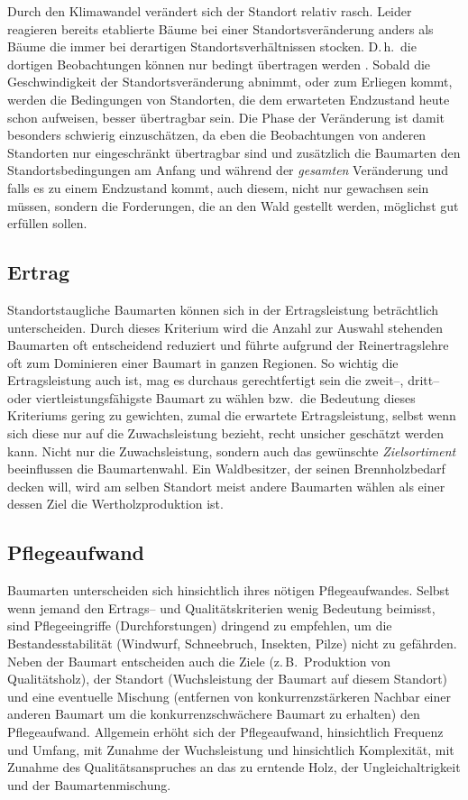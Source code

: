 \documentclass[twocolumn]{scrartcl}
\begin{document}
Durch den Klimawandel verändert sich der Standort relativ
rasch. Leider reagieren bereits etablierte Bäume bei einer
Standortsveränderung anders als Bäume die immer bei derartigen
Standortsverhältnissen stocken. D.\,h.\ die dortigen Beobachtungen können
nur bedingt übertragen werden \cite{yue2022SiteIndex}. Sobald die
Geschwindigkeit der Standortsveränderung abnimmt, oder zum Erliegen
kommt, werden die Bedingungen von Standorten, die dem erwarteten Endzustand
heute schon aufweisen, besser übertragbar sein. Die Phase der
Veränderung ist damit besonders schwierig einzuschätzen, da eben die
Beobachtungen von anderen Standorten nur eingeschränkt übertragbar
sind und zusätzlich die Baumarten den Standortsbedingungen am Anfang
und während der \emph{gesamten} Veränderung und falls es zu einem
Endzustand kommt, auch diesem, nicht nur gewachsen sein müssen, sondern
die Forderungen, die an den Wald gestellt werden, möglichst gut
erfüllen sollen.

\subsection{Ertrag}
\label{ssec:ertrag}

Standortstaugliche Baumarten können sich in der Ertragsleistung
beträchtlich unterscheiden. Durch dieses Kriterium wird die Anzahl zur
Auswahl stehenden Baumarten oft entscheidend reduziert und führte
aufgrund der Reinertragslehre oft zum Dominieren einer Baumart in
ganzen Regionen. So wichtig die Ertragsleistung auch ist, mag es
durchaus gerechtfertigt sein die zweit--, dritt-- oder
viertleistungsfähigste Baumart zu wählen bzw.\ die Bedeutung dieses
Kriteriums gering zu gewichten, zumal die erwartete Ertragsleistung,
selbst wenn sich diese nur auf die Zuwachsleistung bezieht, recht
unsicher geschätzt werden kann. Nicht nur die Zuwachsleistung, sondern
auch das gewünschte \emph{Zielsortiment} beeinflussen die
Baumartenwahl. Ein Waldbesitzer, der seinen Brennholzbedarf decken
will, wird am selben Standort meist andere Baumarten wählen als einer
dessen Ziel die Wertholzproduktion ist.

\subsection{Pflegeaufwand}
\label{ssec:pflegeaufwand}

Baumarten unterscheiden sich hinsichtlich ihres nötigen
Pflegeaufwandes. Selbst wenn jemand den Ertrags-- und
Qualitätskriterien wenig Bedeutung beimisst, sind Pflegeeingriffe
(Durchforstungen) dringend zu empfehlen, um die Bestandesstabilität
(Windwurf, Schneebruch, Insekten, Pilze) nicht zu gefährden. Neben der
Baumart entscheiden auch die Ziele (z.\,B.\ Produktion von
Qualitätsholz), der Standort (Wuchsleistung der Baumart auf diesem
Standort) und eine eventuelle Mischung (entfernen von
konkurrenzstärkeren Nachbar einer anderen Baumart um die
konkurrenzschwächere Baumart zu erhalten) den Pflegeaufwand. Allgemein
erhöht sich der Pflegeaufwand, hinsichtlich Frequenz und Umfang, mit
Zunahme der Wuchsleistung und hinsichtlich Komplexität, mit Zunahme
des Qualitätsanspruches an das zu erntende Holz, der
Ungleichaltrigkeit und der Baumartenmischung.
\end{document}
